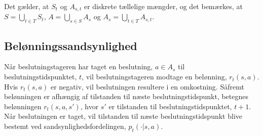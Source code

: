 Det gælder, at $S_t$ og $A_{s,t}$ er diskrete tællelige mængder, og det bemærkes, at \\$S=\displaystyle \bigcup_{t\in T}S_t$, $A=\displaystyle \bigcup_{s\in S} A_s$ og $A_s=\displaystyle\bigcup_{t\in T}A_{s,t}$.



\subsection{Belønningssandsynlighed}
Når beslutningstageren har taget en beslutning, $a\in A_{s}$ til beslutningstidspunktet, $t$, vil beslutningstageren modtage en belønning, $r_t(s,a)$. Hvis $r_t(s,a)$ er negativ, vil beslutningen resultere i en omkostning. Såfremt belønningen er afhængig af tilstanden til næste beslutningstidspunkt, betegnes belønningen $r_t(s, a, s')$, hvor $s'$ er tilstanden til beslutningstidspunktet, $t+1$.
Når beslutningen er taget, vil tilstanden til næste beslutningstidspunkt blive bestemt ved sandsynlighedsfordelingen, $p_t(\cdot|s,a)$. 





